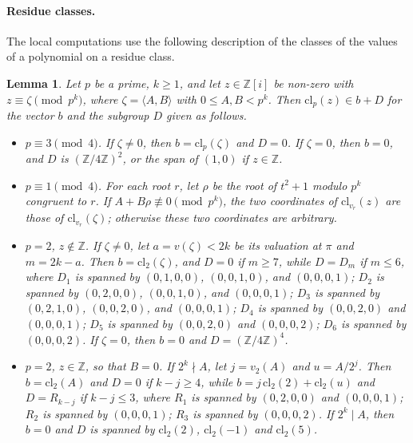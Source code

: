 \documentclass[11pt]{article}
\newtheorem{lemma}[theorem]{Lemma}
\newcommand{\Z}{\mathbb{Z}}
\begin{document}
\paragraph{Residue classes.} The local computations use the following description of the classes of the values of a polynomial on a residue class.

\begin{lemma}\label{lem:cresidue}
Let $p$ be a prime, $k\geq1$, and let $z\in\Z[i]$ be non-zero with $z\equiv\zeta\pmod{p^k}$, where $\zeta=\langle A,B\rangle$ with $0\leq A,B<p^k$. Then $\mathrm{cl}_p(z)\in b+D$ for the vector $b$ and the subgroup $D$ given as follows.
\begin{itemize}
\item[(i)] $p\equiv3\pmod4$. If $\zeta\neq0$, then $b=\mathrm{cl}_p(\zeta)$ and $D=0$. If $\zeta=0$, then $b=0$, and $D$ is $(\Z/4\Z)^2$, or the span of $(1,0)$ if $z\in\Z$.
\item[(ii)] $p\equiv1\pmod4$. For each root $r$, let $\rho$ be the root of $t^2+1$ modulo $p^k$ congruent to $r$. If $A+B\rho\not\equiv0\pmod{p^k}$, the two coordinates of $\mathrm{cl}_{v_r}(z)$ are those of $\mathrm{cl}_{v_r}(\zeta)$; otherwise these two coordinates are arbitrary.
\item[(iii)] $p=2$, $z\notin\Z$. If $\zeta\neq0$, let $a=v(\zeta)<2k$ be its valuation at $\pi$ and $m=2k-a$. Then $b=\mathrm{cl}_2(\zeta)$, and $D=0$ if $m\geq7$, while $D=D_m$ if $m\leq6$, where $D_1$ is spanned by $(0,1,0,0)$, $(0,0,1,0)$, and $(0,0,0,1)$; $D_2$ is spanned by $(0,2,0,0)$, $(0,0,1,0)$, and $(0,0,0,1)$; $D_3$ is spanned by $(0,2,1,0)$, $(0,0,2,0)$, and $(0,0,0,1)$; $D_4$ is spanned by $(0,0,2,0)$ and $(0,0,0,1)$; $D_5$ is spanned by $(0,0,2,0)$ and $(0,0,0,2)$; $D_6$ is spanned by $(0,0,0,2)$. If $\zeta=0$, then $b=0$ and $D=(\Z/4\Z)^4$.
\item[(iv)] $p=2$, $z\in\Z$, so that $B=0$. If $2^k\nmid A$, let $j=v_2(A)$ and $u=A/2^j$. Then $b=\mathrm{cl}_2(A)$ and $D=0$ if $k-j\geq4$, while $b=j\,\mathrm{cl}_2(2)+\mathrm{cl}_2(u)$ and $D=R_{k-j}$ if $k-j\leq3$, where $R_1$ is spanned by $(0,2,0,0)$ and $(0,0,0,1)$; $R_2$ is spanned by $(0,0,0,1)$; $R_3$ is spanned by $(0,0,0,2)$. If $2^k\mid A$, then $b=0$ and $D$ is spanned by $\mathrm{cl}_2(2)$, $\mathrm{cl}_2(-1)$ and $\mathrm{cl}_2(5)$.
\end{itemize}
\end{lemma}
\end{document}
